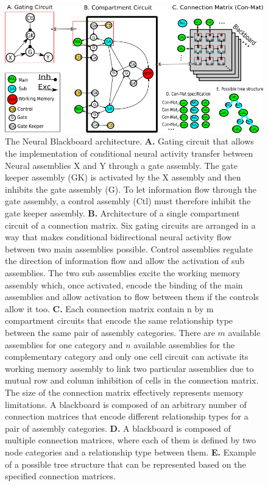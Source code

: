 \documentclass[10pt]{article}
\begin{document}
\begin{figure}[h!]
  \begin{center}
    \includegraphics[width=1.00\columnwidth]{figures/gating_circuit3}
    \caption{The Neural Blackboard architecture.
      \textbf{A.} Gating circuit that allows the implementation of conditional neural activity transfer between Neural assemblies X and Y through a gate assembly.
      The gate keeper assembly (GK) is activated by the X assembly and then inhibits the gate assembly (G).
      To let information flow through the gate assembly, a control assembly (Ctl) must therefore inhibit the gate keeper assembly.
      \textbf{B.} Architecture of a single compartment circuit of a connection matrix.
      Six gating circuits are arranged in a way that makes conditional bidirectional neural activity flow between two main assemblies possible.
      Control assemblies regulate the direction of information flow and allow the activation of sub assemblies.
      The two sub assemblies excite the working memory assembly which, once activated, encode the binding of the main assemblies and allow activation to flow between them if the controls allow it too.
      \textbf{C.} Each connection matrix contain n by m compartment circuits that encode the same relationship type between the same pair of assembly categories.
      There are $m$ available assemblies for one category and $n$ available assemblies for the complementary category and only one cell circuit can activate its working memory assembly to link two particular assemblies due to mutual row and column inhibition of cells in the connection matrix.
      The size of the connection matrix effectively represents memory limitations.
      A blackboard is composed of an arbitrary number of connection matrices that encode different relationship types for a pair of assembly categories.
      \textbf{D.} A blackboard is composed of multiple connection matrices, where each of them is defined by two node categories and a relationship type between them.
      \textbf{E.} Example of a possible tree structure that can be represented based on the specified connection matrices. }
      \label{Blackboard}
  \end{center}
\end{figure}
\end{document}
